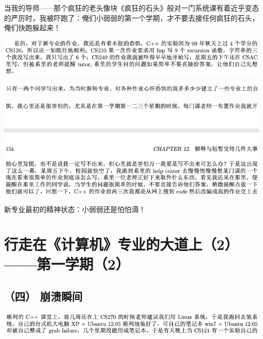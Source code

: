 \documentclass[9pt, b5paper]{article}
\begin{document}
当我的导师——那个疯狂的老头像块《疯狂的石头》般对一门系统课有着近乎变态的严厉时，我被吓跑了：俺们小弱弱的第一个学期，才不要去接任何疯狂的石头，俺们快跑躲起来！

\begin{center}
\includegraphics[width=.9\linewidth]{./pic/backups_plans_20210424_203308.png}
\end{center}

\begin{center}
\includegraphics[width=.9\linewidth]{./pic/backups_plans_20210425_110847.png}
\end{center}

\begin{center}
\includegraphics[width=.9\linewidth]{./pic/backups_plans_20210425_112104.png}
\end{center}

新专业最初的精神状态：小弱弱还是怕怕滴！

\section{行走在《计算机》专业的大道上（2）——第一学期（2）}
\label{sec:orge440ce4}
\subsection{（四） 崩溃瞬间}
\label{sec:org6c7f423}

\begin{center}
\includegraphics[width=.9\linewidth]{./pic/backups_plans_20210424_203440.png}
\end{center}
\end{document}
